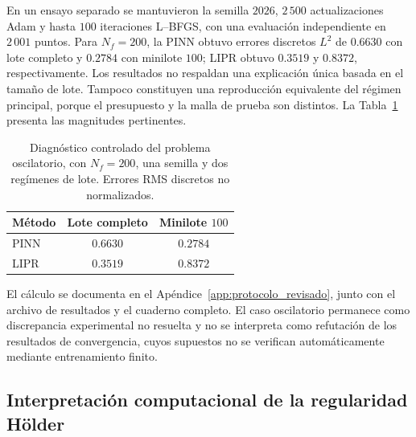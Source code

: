 En un ensayo separado se mantuvieron la semilla $2026$, $2\,500$ actualizaciones Adam y hasta $100$ iteraciones L--BFGS, con una evaluación independiente en $2\,001$ puntos. Para $N_f=200$, la PINN obtuvo errores discretos $L^2$ de $0.6630$ con lote completo y $0.2784$ con minilote $100$; LIPR obtuvo $0.3519$ y $0.8372$, respectivamente. Los resultados no respaldan una explicación única basada en el tamaño de lote. Tampoco constituyen una reproducción equivalente del régimen principal, porque el presupuesto y la malla de prueba son distintos. La Tabla~\ref{tab:shin_diagnostico_nuevo} presenta las magnitudes pertinentes.

\begin{table}[htbp]
\centering
\caption{Diagnóstico controlado del problema oscilatorio, con $N_f=200$, una semilla y dos regímenes de lote. Errores RMS discretos no normalizados.}
\label{tab:shin_diagnostico_nuevo}
\begin{tabular}{lcc}
\hline
Método & Lote completo & Minilote $100$ \\
\hline
PINN & $0.6630$ & $0.2784$ \\
LIPR & $0.3519$ & $0.8372$ \\
\hline
\end{tabular}
\end{table}

El cálculo se documenta en el Apéndice~\ref{app:protocolo_revisado}, junto con el archivo de resultados y el cuaderno completo. El caso oscilatorio permanece como discrepancia experimental no resuelta y no se interpreta como refutación de los resultados de convergencia, cuyos supuestos no se verifican automáticamente mediante entrenamiento finito.

\subsection{Interpretación computacional de la regularidad H\"older}
\label{subsec:holder_experimento}

